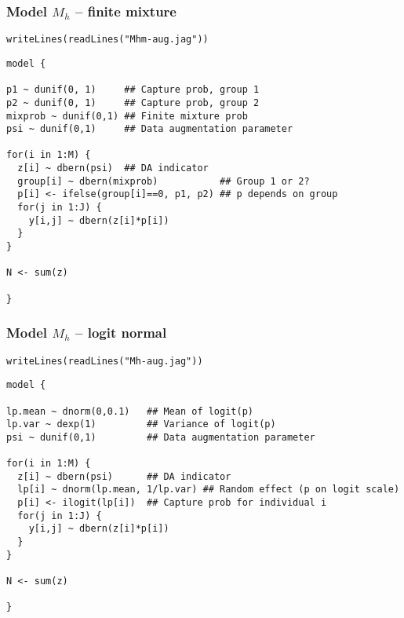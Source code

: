 \documentclass[color=usenames,dvipsnames]{beamer}\usepackage[]{graphicx}\usepackage[]{color}
\makeatletter
\newcommand{\hlstr}[1]{\textcolor[rgb]{0.749,0.012,0.012}{#1}}%
\newcommand{\hlstd}[1]{\textcolor[rgb]{0,0,0}{#1}}%
\newcommand{\hlkwd}[1]{\textcolor[rgb]{0.004,0.004,0.506}{#1}}%
\newenvironment{kframe}{%
 \def\at@end@of@kframe{}%
 \ifinner\ifhmode%
  \def\at@end@of@kframe{\end{minipage}}%
  \begin{minipage}{\columnwidth}%
 \fi\fi%
 \def\FrameCommand##1{\hskip\@totalleftmargin \hskip-\fboxsep
 \colorbox{shadecolor}{##1}\hskip-\fboxsep
     \hskip-\linewidth \hskip-\@totalleftmargin \hskip\columnwidth}%
 \MakeFramed {\advance\hsize-\width
   \@totalleftmargin\z@ \linewidth\hsize
   \@setminipage}}%
 {\par\unskip\endMakeFramed%
 \at@end@of@kframe}
\newenvironment{knitrout}{}{} %
\makeatother
\begin{document}
\begin{frame}[fragile]
  \frametitle{Model $M_h$ -- finite mixture}
\vspace{-3pt}
\begin{knitrout}\footnotesize
{}\color{fgcolor}\begin{kframe}
\begin{alltt}
\hlkwd{writeLines}\hlstd{(}\hlkwd{readLines}\hlstd{(}\hlstr{"Mhm-aug.jag"}\hlstd{))}
\end{alltt}
\begin{verbatim}
model {

p1 ~ dunif(0, 1)     ## Capture prob, group 1
p2 ~ dunif(0, 1)     ## Capture prob, group 2
mixprob ~ dunif(0,1) ## Finite mixture prob
psi ~ dunif(0,1)     ## Data augmentation parameter

for(i in 1:M) {     
  z[i] ~ dbern(psi)  ## DA indicator
  group[i] ~ dbern(mixprob)           ## Group 1 or 2?
  p[i] <- ifelse(group[i]==0, p1, p2) ## p depends on group
  for(j in 1:J) {
    y[i,j] ~ dbern(z[i]*p[i])
  }
}

N <- sum(z)

}
\end{verbatim}
\end{kframe}
\end{knitrout}
\end{frame}



\begin{frame}[fragile]
  \frametitle{Model $M_h$ -- logit normal}
\vspace{-3pt}
\begin{knitrout}\footnotesize
{}\color{fgcolor}\begin{kframe}
\begin{alltt}
\hlkwd{writeLines}\hlstd{(}\hlkwd{readLines}\hlstd{(}\hlstr{"Mh-aug.jag"}\hlstd{))}
\end{alltt}
\begin{verbatim}
model {

lp.mean ~ dnorm(0,0.1)   ## Mean of logit(p)
lp.var ~ dexp(1)         ## Variance of logit(p)
psi ~ dunif(0,1)         ## Data augmentation parameter

for(i in 1:M) {     
  z[i] ~ dbern(psi)      ## DA indicator
  lp[i] ~ dnorm(lp.mean, 1/lp.var) ## Random effect (p on logit scale)
  p[i] <- ilogit(lp[i])  ## Capture prob for individual i
  for(j in 1:J) {
    y[i,j] ~ dbern(z[i]*p[i])
  }
}

N <- sum(z)

}
\end{verbatim}
\end{kframe}
\end{knitrout}
\end{frame}
\end{document}
